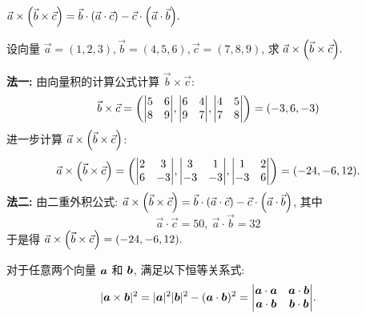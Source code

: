 \begin{theorem}[二重外积公式]
    $\vec{a}\times\qty(\vec{b}\times\vec{c})=\vec{b}\cdot\qty(\vec{a}\cdot\vec{c})-\vec{c}\cdot\qty(\vec{a}\cdot\vec{b}).$
\end{theorem}

\begin{example}[2023 四川大学]
    设向量 $\vec{a}=(1,2,3),\vec{b}=(4,5,6),\vec{c}=(7,8,9)$, 求 $\vec{a}\times\qty(\vec{b}\times\vec{c}).$
\end{example}
\begin{solution}
    \textbf{法一: }由向量积的计算公式计算 $\vec{b}\times\vec{c}$:
    $$\vec{b}\times\vec{c}=\qty(\mqty|5&6\\8&9|,\mqty|6&4\\9&7|,\mqty|4&5\\7&8|)=(-3,6,-3)$$
    进一步计算 $\vec{a}\times\qty(\vec{b}\times\vec{c})$:
    $$\vec{a}\times\qty(\vec{b}\times\vec{c})=\qty(\mqty|2&3\\6&-3|,\mqty|3&1\\-3&-3|,\mqty|1&2\\-3&6|)=(-24,-6,12).$$
    \textbf{法二: }由二重外积公式: $\vec{a}\times\qty(\vec{b}\times\vec{c})=\vec{b}\cdot\qty(\vec{a}\cdot\vec{c})-\vec{c}\cdot\qty(\vec{a}\cdot\vec{b})$, 其中
    $$\vec{a}\cdot\vec{c}=50,~\vec{a}\cdot\vec{b}=32$$
    于是得 $\vec{a}\times\qty(\vec{b}\times\vec{c})=(-24,-6,12).$
\end{solution}

\begin{theorem}
    对于任意两个向量 $\vb*{a}$ 和 $\vb*{b}$, 满足以下恒等关系式:
    $$|\vb*{a} \times \vb*{b}|^{2}=|\vb*{a}|^{2}|\vb*{b}|^{2}-(\vb*{a} \cdot \vb*{b})^{2}
        =\mqty|\vb*{a} \cdot \vb*{a} & \vb*{a} \cdot \vb*{b} \\
        \vb*{a} \cdot \vb*{b} & \vb*{b} \cdot \vb*{b}|.$$
\end{theorem}

